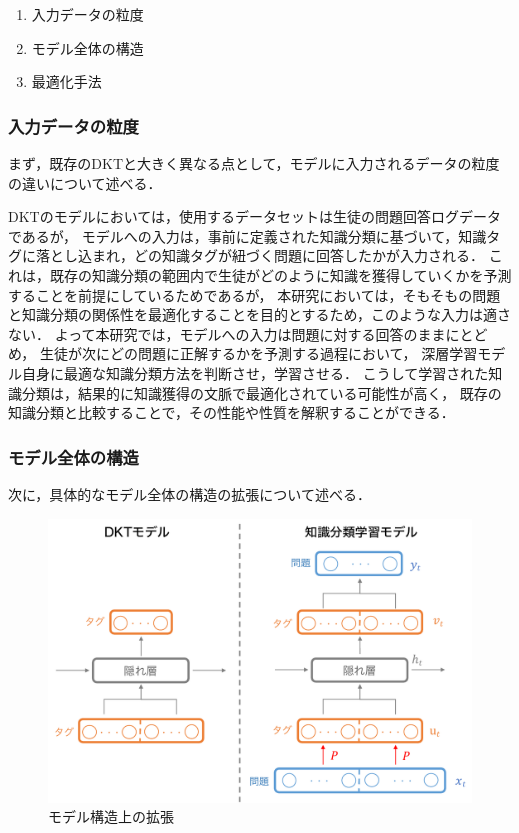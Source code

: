 \begin{enumerate}
	\item 入力データの粒度
	\item モデル全体の構造
	\item 最適化手法
\end{enumerate}


\subsubsection{入力データの粒度}
まず，既存のDKTと大きく異なる点として，モデルに入力されるデータの粒度の違いについて述べる．

DKTのモデルにおいては，使用するデータセットは生徒の問題回答ログデータであるが，
モデルへの入力は，事前に定義された知識分類に基づいて，知識タグに落とし込まれ，どの知識タグが紐づく問題に回答したかが入力される．
これは，既存の知識分類の範囲内で生徒がどのように知識を獲得していくかを予測することを前提にしているためであるが，
本研究においては，そもそもの問題と知識分類の関係性を最適化することを目的とするため，このような入力は適さない．
よって本研究では，モデルへの入力は問題に対する回答のままにとどめ，
生徒が次にどの問題に正解するかを予測する過程において，
深層学習モデル自身に最適な知識分類方法を判断させ，学習させる．
こうして学習された知識分類は，結果的に知識獲得の文脈で最適化されている可能性が高く，
既存の知識分類と比較することで，その性能や性質を解釈することができる．


\subsubsection{モデル全体の構造}
次に，具体的なモデル全体の構造の拡張について述べる．

\begin{figure}[htb]
\begin{center}
	\includegraphics[width=360pt]{./img/model.pdf}
	\caption{モデル構造上の拡張}
	\label{fig:model}
\end{center}
\end{figure}


